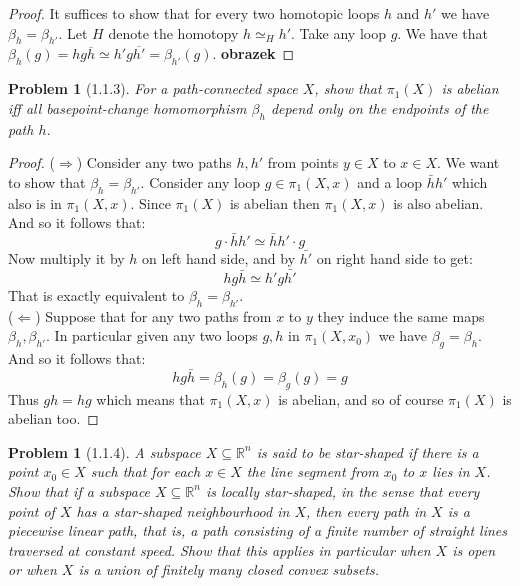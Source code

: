 \documentclass[11pt, a4paper, final]{amsart}
\newcommand\todo[1]{\textbf{\textcolor{redd}{#1}}}
\numberwithin{theorem}{section}
\newtheorem{problem}[theorem]{Problem}
\theoremstyle{definition}
\theoremstyle{remark}
\begin{document}
\begin{proof}
    It suffices to show that for every two homotopic loops $h$ and $h'$ we have $\beta_h = \beta_{h'}$. Let $H$ denote the homotopy $h \simeq_{H} h'$. Take any loop $g$. We have that $\beta_h(g) = hg\overline{h} \simeq h'g\overline{h'} = \beta_{h'}(g)$. \todo{obrazek}
\end{proof}

\begin{problem}[1.1.3]\label{problem: 1.1.3}
    For a path-connected space \(X\), show that \(\pi_1(X)\) is abelian iff all basepoint-change homomorphism \(\beta_h\) depend only on the endpoints of the path \(h\).
\end{problem}

\begin{proof}
    ($\Rightarrow$)
    Consider any two paths $h,h'$ from points $y \in X$ to $x \in X$. We want to show that $\beta_h = \beta_{h'}$. Consider any loop $g \in \pi_1(X,x)$ and a loop $\bar{h}h'$ which also is in $\pi_1(X,x)$. Since $\pi_1(X)$ is abelian then $\pi_1(X,x)$ is also abelian. And so it follows that:
    \[
        g\cdot \bar{h}h' \simeq \bar{h}h' \cdot g 
    \]
    Now multiply it by $h$ on left hand side, and by $\bar{h'}$ on right hand side to get: 
    \[
        hg\bar{h} \simeq h'g\bar{h'}
    \]
    That is exactly equivalent to $\beta_h =\beta_{h'}$. \\

    ($\Leftarrow$) Suppose that for any two paths from $x$ to $y$ they induce the same maps $\beta_h,\beta_{h'}$. In particular given any two loops $g,h$ in $\pi_1(X,x_0)$ we have $\beta_g = \beta_h$. And so it follows that:
    \[
    hg\bar{h}= \beta_h(g) =\beta_g(g)=g
    \]
    Thus $gh = hg$ which means that $\pi_1(X,x)$ is abelian, and so of course $\pi_1(X)$ is abelian too.
\end{proof}

\begin{problem}[1.1.4]\label{problem: 1.1.4.}
    A subspace \(X \subseteq \mathbb{R}^n\) is said to be \emph{star-shaped} if there is a point \(x_0 \in X\) such that for each \(x \in X\) the line segment from \(x_0\) to \(x\) lies in \(X\). Show that if a subspace \( X \subseteq \mathbb{R}^n\) is locally star-shaped, in the sense that every point of \(X\) has a star-shaped neighbourhood in \(X\), then every path in \(X\) is a piecewise linear path, that is, a path consisting of a finite number of straight lines traversed at constant speed. Show that this applies in particular when \(X\) is open or when \(X\) is a union of finitely many closed convex subsets.
\end{problem}
\end{document}
